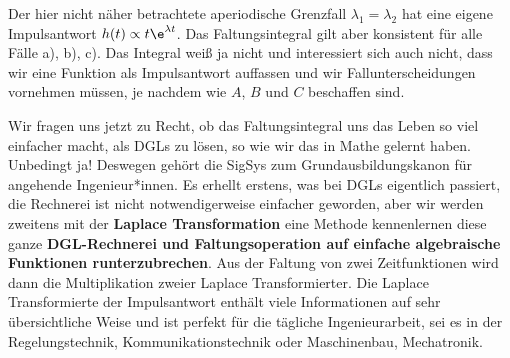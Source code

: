 Der hier nicht näher betrachtete aperiodische Grenzfall $\lambda_1 = \lambda_2$
hat eine eigene Impulsantwort $h(t) \propto t \e^{\lambda t}$.
%
Das Faltungsintegral gilt aber konsistent
für alle Fälle a), b), c). Das Integral weiß ja nicht und interessiert sich auch nicht,
dass wir eine Funktion als Impulsantwort auffassen und wir Fallunterscheidungen
vornehmen müssen, je nachdem wie $A$, $B$ und $C$ beschaffen sind.

Wir fragen uns jetzt zu Recht, ob das Faltungsintegral
uns das Leben so viel einfacher macht, als DGLs zu lösen, so wie wir das in Mathe
gelernt haben.
%
Unbedingt ja! Deswegen gehört die SigSys zum Grundausbildungskanon für angehende
Ingenieur*innen.
Es erhellt erstens, was bei DGLs eigentlich passiert, die Rechnerei
ist nicht notwendigerweise einfacher geworden, aber wir werden zweitens mit der
\textbf{Laplace Transformation} eine
Methode kennenlernen diese ganze \textbf{DGL-Rechnerei und Faltungsoperation auf
einfache algebraische Funktionen runterzubrechen}. Aus der Faltung von zwei
Zeitfunktionen wird dann die Multiplikation zweier Laplace Transformierter.
%
Die Laplace Transformierte der Impulsantwort enthält viele Informationen auf
sehr übersichtliche Weise und ist perfekt für die tägliche Ingenieurarbeit, sei
es in der Regelungstechnik, Kommunikationstechnik oder Maschinenbau, Mechatronik.

\newpage
